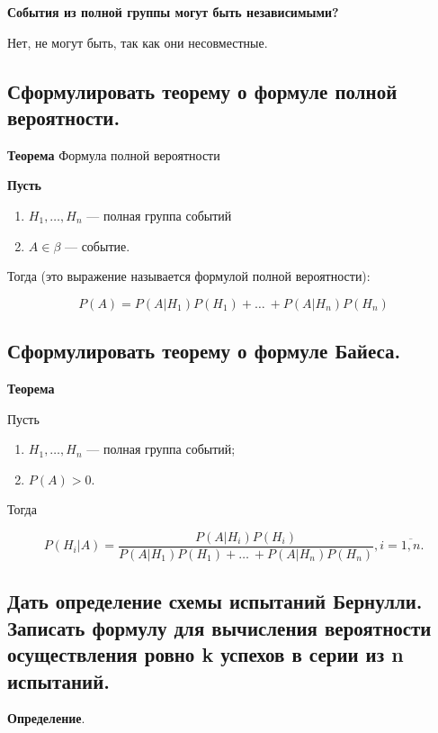 \textbf{События из полной группы могут быть независимыми?}

Нет, не могут быть, так как они несовместные.

\subsection{Сформулировать теорему о формуле полной вероятности.}

\textbf{Теорема} Формула полной вероятности

\textbf{Пусть}

\begin{enumerate}
	\item $H_1, \dots, H_n$ --- полная группа событий
	\item $A \in \beta$ --- событие.
\end{enumerate}

Тогда (это выражение называется формулой полной вероятности):

\begin{equation}
	P(A) = P(A|H_1)P(H_1) + \dots\ + P(A|H_n)P(H_n)
\end{equation}

\subsection{Сформулировать теорему о формуле Байеса.}

\textbf{Теорема} 

Пусть

\begin{enumerate}
	\item $H_1, \dots, H_n$ --- полная группа событий;
	\item $P(A) > 0$.
\end{enumerate}

Тогда

\begin{equation}
	P(H_i|A) = \frac{P(A|H_i)P(H_i)}{P(A|H_1)P(H_1) + \dots\ + P(A|H_n)P(H_n)}, i = \overline{1, n}.
\end{equation}

\subsection{Дать определение схемы испытаний Бернулли. Записать формулу для вычисления вероятности осуществления ровно k успехов в серии из n испытаний.}

\textbf{Определение}. 

